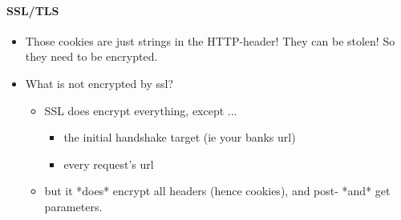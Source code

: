 \paragraph{SSL/TLS}
\begin{itemize}
     \item Those cookies are just strings in the HTTP-header! They can be stolen! So they need to be encrypted.
     \item What is not encrypted by ssl? \begin{itemize}
          \item SSL does encrypt everything, except ... \begin{itemize}
               \item   the initial handshake target (ie your banks url)
               \item   every request's url 
          \end{itemize}
          \item but it *does* encrypt all headers (hence cookies), and post- *and* get parameters.
     \end{itemize}
\end{itemize}
      



